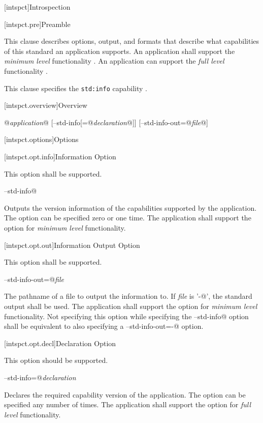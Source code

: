
[intspct]{Introspection}

[intspct.pre]{Preamble}

\pnum
This clause describes options, output, and formats that describe what
capabilities of this standard an application supports. An application shall
support the \emph{minimum level} functionality . An
application can support the \emph{full level} functionality .

\pnum
This clause specifies the \verb|std:info| capability .

[intspct.overview]{Overview}

\pnum
\begin{outputblock}
@\emph{application}@ [--std-info[=@\emph{declaration}@]] [--std-info-out=@\emph{file}@]
\end{outputblock}

[intspct.options]{Options}

[intspct.opt.info]{Information Option}

\pnum
This option shall be supported.

\pnum
\verb@--std-info@
\begin{indented}
	Outputs the version information of the capabilities supported by the
	application.
	The option can be specified zero or one time.
	The application shall support the option for \emph{minimum level}
	 functionality.
\end{indented}

[intspct.opt.out]{Information Output Option}

\pnum
This option shall be supported.

\pnum
\verb@--std-info-out=@\emph{file}
\begin{indented}
	The pathname of a file to output the information to. If \emph{file} is
	'\verb@-@', the standard output shall be used.
	The application shall support the option for \emph{minimum level}
	 functionality.
	Not specifying this option while specifying the \verb@--std-info@ option
	 shall be equivalent to also specifying a
	\verb@--std-info-out=-@ option.
\end{indented}

[intspct.opt.decl]{Declaration Option}

\pnum
This option should be supported.

\pnum
\verb@--std-info=@\emph{declaration}
\begin{indented}
	Declares the required capability version of the application.
	The option can be specified any number of times.
	The application shall support the option for \emph{full level}
	 functionality.
\end{indented}

